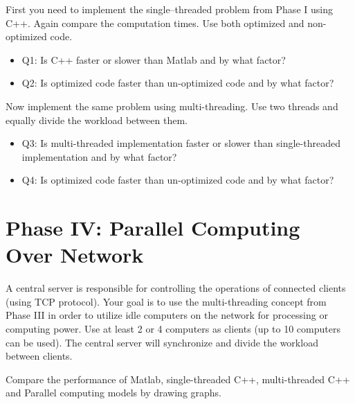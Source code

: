 \documentclass{article}
\begin{document}
First you need to implement the single--threaded problem from Phase I using C++. Again compare the computation times. Use both optimized and non-optimized code.

\begin{itemize}
\item Q1: Is C++ faster or slower than Matlab and by what factor?
\item Q2: Is optimized code faster than un-optimized code and by what factor?
\end{itemize}

Now implement the same problem using multi-threading. Use two threads and equally divide the workload between them.

\begin{itemize}
\item Q3: Is multi-threaded implementation faster or slower than single-threaded implementation and by what factor?
\item Q4: Is optimized code faster than un-optimized code and by what factor?
\end{itemize}

\section{Phase IV: Parallel Computing Over Network}

A central server is responsible for controlling the operations of connected clients (using TCP protocol). Your goal is to use the multi-threading concept from Phase III in order to utilize idle computers on the network for processing or computing power. Use at least 2 or 4 computers as clients (up to 10 computers can be used). The central server will synchronize and divide the workload between clients.

Compare the performance of Matlab, single-threaded C++, multi-threaded C++ and Parallel computing models by drawing graphs.
%
\end{document}
